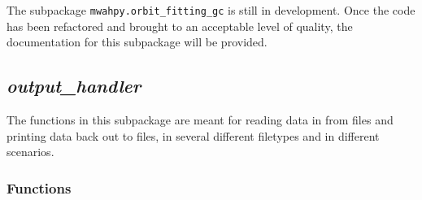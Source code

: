 \documentclass{article}
\begin{document}
The subpackage \verb!mwahpy.orbit_fitting_gc! is still in development. Once the code has been refactored and brought to an acceptable level of quality, the documentation for this subpackage will be provided.  

\subsection{\textit{output\_handler}}

The functions in this subpackage are meant for reading data in from files and printing data back out to files, in several different filetypes and in different scenarios.

\subsubsection{Functions}
\end{document}
